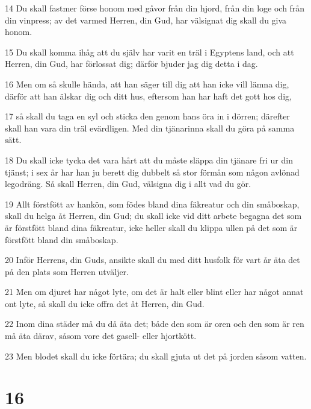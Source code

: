 \par 14 Du skall fastmer förse honom med gåvor från din hjord, från din loge och från din vinpress; av det varmed Herren, din Gud, har välsignat dig skall du giva honom.
\par 15 Du skall komma ihåg att du själv har varit en träl i Egyptens land, och att Herren, din Gud, har förlossat dig; därför bjuder jag dig detta i dag.
\par 16 Men om så skulle hända, att han säger till dig att han icke vill lämna dig, därför att han älskar dig och ditt hus, eftersom han har haft det gott hos dig,
\par 17 så skall du taga en syl och sticka den genom hans öra in i dörren; därefter skall han vara din träl evärdligen. Med din tjänarinna skall du göra på samma sätt.
\par 18 Du skall icke tycka det vara hårt att du måste släppa din tjänare fri ur din tjänst; i sex år har han ju berett dig dubbelt så stor förmån som någon avlönad legodräng. Så skall Herren, din Gud, välsigna dig i allt vad du gör.
\par 19 Allt förstfött av hankön, som födes bland dina fäkreatur och din småboskap, skall du helga åt Herren, din Gud; du skall icke vid ditt arbete begagna det som är förstfött bland dina fäkreatur, icke heller skall du klippa ullen på det som är förstfött bland din småboskap.
\par 20 Inför Herrens, din Guds, ansikte skall du med ditt husfolk för vart år äta det på den plats som Herren utväljer.
\par 21 Men om djuret har något lyte, om det är halt eller blint eller har något annat ont lyte, så skall du icke offra det åt Herren, din Gud.
\par 22 Inom dina städer må du då äta det; både den som är oren och den som är ren må äta därav, såsom vore det gasell- eller hjortkött.
\par 23 Men blodet skall du icke förtära; du skall gjuta ut det på jorden såsom vatten.

\chapter{16}

